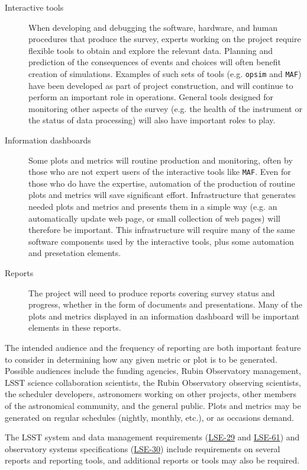 \begin{description}
\item[{Interactive tools}] When developing and debugging the software, hardware, and human procedures that produce the survey, experts working on the project require flexible tools to obtain and explore the relevant data. Planning and prediction of the consequences of events and choices will often benefit creation of simulations. Examples of such sets of tools (e.g. \texttt{opsim} and \texttt{MAF}) have been developed as part of project construction, and will continue to perform an important role in operations. General tools designed for monitoring other aspects of the survey (e.g. the health of the instrument or the status of data processing) will also have important roles to play.
\item[{Information dashboards}] Some plots and metrics will routine production and monitoring, often by those who are not expert users of the interactive tools like \texttt{MAF}. Even for those who do have the expertise, automation of the production of routine plots and metrics will save significant effort. Infrastructure that generates needed plots and metrics and presents them in a simple way (e.g. an automatically update web page, or small collection of web pages) will therefore be important. This infrastructure will require many of the same software components used by the interactive tools, plus some automation and presetation elements.
\item[{Reports}] The project will need to produce reports covering survey status and progress, whether in the form of documents and presentations. Many of the plots and metrics displayed in an information dashboard will be important elements in these reports.
\end{description}

The intended audience and the frequency of reporting are both important feature to consider in determining how any given metric or plot is to be generated.
Possible audiences include the funding agencies, Rubin Observatory management, LSST science collaboration scientists, the Rubin Observatory observing scientists, the scheduler developers, astronomers working on other projects, other members of the astronomical community, and the general public. 
Plots and metrics may be generated on regular schedules (nightly, monthly, etc.), or as occasions demand.

The LSST system and data management requirements (\href{https://ls.st/lse-29}{LSE-29} and \href{https://ls.st/lse-61}{LSE-61}) and observatory systems specifications (\href{https://ls.st/lse-30}{LSE-30}) include requirements on several reports and reporting tools, and additional reports or tools may also be required.

